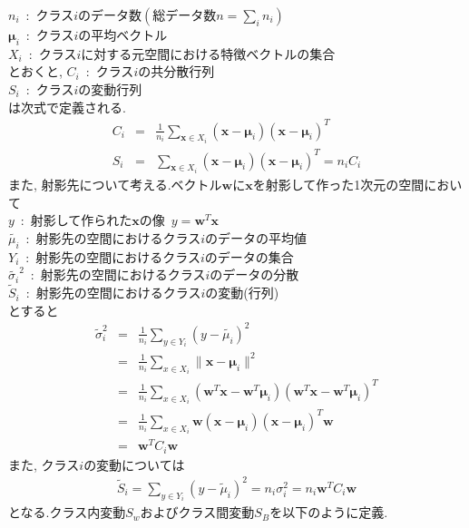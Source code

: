 \documentclass[dvipdfmx,a4j]{jsarticle}
\begin{document}
$n_{i}$\ :\ クラス$i$のデータ数$\displaystyle \left(総データ数 n=\sum_{i}n_{i}\right)$\\
$\bm{\mu}_{i}$\ :\ クラス$i$の平均ベクトル\\
$X_{i}$\ :\ クラス$i$に対する元空間における特徴ベクトルの集合\\
とおくと,
$C_{i}$\ :\ クラス$i$の共分散行列\\
$S_{i}$\ :\ クラス$i$の変動行列\\
は次式で定義される.
\begin{eqnarray*}
    C_{i}&=&\frac{1}{n_{i}}\sum_{\bm{x}\in X_{i}}(\bm{x}-\bm{\mu}_{i})(\bm{x}-\bm{\mu}_{i})^{T}\\
    S_{i}&=&\sum_{\bm{x}\in X_{i}}(\bm{x}-\bm{\mu}_{i})(\bm{x}-\bm{\mu}_{i})^{T}=n_{i}C_{i}
\end{eqnarray*}
また, 射影先について考える.ベクトル$\bm{w}$に$\bm{x}$を射影して作った1次元の空間において\\
$y$\ :\ 射影して作られた$\bm{x}$の像\ $y=\bm{w}^{T}\bm{x}$\\
$\tilde{\mu_{i}}$\  :\ 射影先の空間におけるクラス$i$のデータの平均値\\
$Y_{i}$\ :\ 射影先の空間におけるクラス$i$のデータの集合\\
$\tilde{\sigma_{i}}^{2}$\ :\ 射影先の空間におけるクラス$i$のデータの分散\\
$\tilde{S}_{i}$\ :\ 射影先の空間におけるクラス$i$の変動(行列)\\
とすると
\begin{eqnarray*}
    \tilde{\sigma}_{i}^{2}&=&\frac{1}{n_{i}}\sum_{y\in Y_{i}}(y-\tilde{\mu_{i}})^{2}\\
                          &=&\frac{1}{n_{i}}\sum_{x\in X_{i}}\|\bm{x}-\bm{\mu}_{i}\|^{2}\\
                          &=&\frac{1}{n_{i}}\sum_{x\in X_{i}}(\bm{w}^{T}\bm{x}-\bm{w}^{T}\bm{\mu}_{i})(\bm{w}^{T}\bm{x}-\bm{w}^{T}\bm{\mu}_{i})^{T}\\
                          &=&\frac{1}{n_{i}}\sum_{x\in X_{i}}\bm{w}(\bm{x}-\bm{\mu}_{i})(\bm{x}-\bm{\mu}_{i})^{T}\bm{w}\\
                          &=&\bm{w}^{T}C_{i}\bm{w}
\end{eqnarray*}
また, クラス$i$の変動については
\begin{eqnarray*}
    \tilde{S}_{i}=\sum_{y\in Y_{i}}(y-\tilde{\mu}_{i})^{2}=n_{i}\sigma_{i}^{2}=n_{i}\bm{w}^{T}C_{i}\bm{w}
\end{eqnarray*}
となる.クラス内変動$S_{w}$およびクラス間変動$S_{B}$を以下のように定義.
\end{document}
